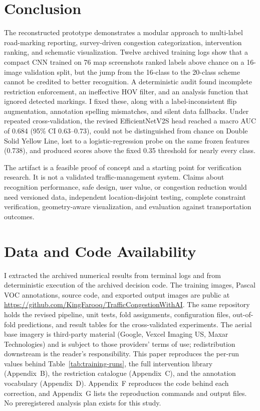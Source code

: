 \documentclass[11pt]{article}
\begin{document}
\section{Conclusion}
The reconstructed prototype demonstrates a modular approach to multi-label road-marking reporting, survey-driven congestion categorization, intervention ranking, and schematic visualization. Twelve archived training logs show that a compact CNN trained on 76 map screenshots ranked labels above chance on a 16-image validation split, but the jump from the 16-class to the 20-class scheme cannot be credited to better recognition. A deterministic audit found incomplete restriction enforcement, an ineffective HOV filter, and an analysis function that ignored detected markings. I fixed these, along with a label-inconsistent flip augmentation, annotation spelling mismatches, and silent data fallbacks. Under repeated cross-validation, the revised EfficientNetV2S head reached a macro AUC of 0.684 (95\% CI 0.63--0.73), could not be distinguished from chance on Double Solid Yellow Line, lost to a logistic-regression probe on the same frozen features (0.738), and produced scores above the fixed 0.35 threshold for nearly every class.

The artifact is a feasible proof of concept and a starting point for verification research. It is not a validated traffic-management system. Claims about recognition performance, safe design, user value, or congestion reduction would need versioned data, independent location-disjoint testing, complete constraint verification, geometry-aware visualization, and evaluation against transportation outcomes.

\section*{Data and Code Availability}
\label{sec:data-code}
I extracted the archived numerical results from terminal logs and from deterministic execution of the archived decision code. The training images, Pascal VOC annotations, source code, and exported output images are public at \url{https://github.com/KingFarooq/TrafficCongestionWithAI}. The same repository holds the revised pipeline, unit tests, fold assignments, configuration files, out-of-fold predictions, and result tables for the cross-validated experiments. The aerial base imagery is third-party material (Google, Vexcel Imaging US, Maxar Technologies) and is subject to those providers' terms of use; redistribution downstream is the reader's responsibility. This paper reproduces the per-run values behind Table~\ref{tab:training-runs}, the full intervention library (Appendix~B), the restriction catalogue (Appendix~C), and the annotation vocabulary (Appendix~D). Appendix~F reproduces the code behind each correction, and Appendix~G lists the reproduction commands and output files. No preregistered analysis plan exists for this study.
\end{document}
